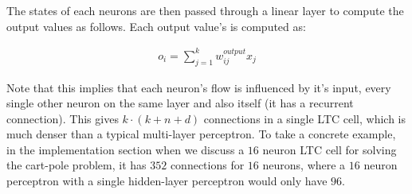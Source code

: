 The states of each neurons are then passed through a linear layer to compute the output values as follows. Each output value's is computed as:

\begin{align*}
    o_i =  \sum_{j=1}^{k} w_{ij}^\textit{output} x_j 
\end{align*}

Note that this implies that each neuron's flow is influenced by it's input, every single other neuron on the same layer and also itself (it has a recurrent connection). This gives $k\cdot(k+n+d)$ connections in a single LTC cell, which is much denser than a typical multi-layer perceptron. To take a concrete example, in the implementation section when we discuss a $16$ neuron LTC cell for solving the cart-pole problem, it has $352$ connections for $16$ neurons, where a $16$ neuron perceptron with a single hidden-layer perceptron would only have $96$.